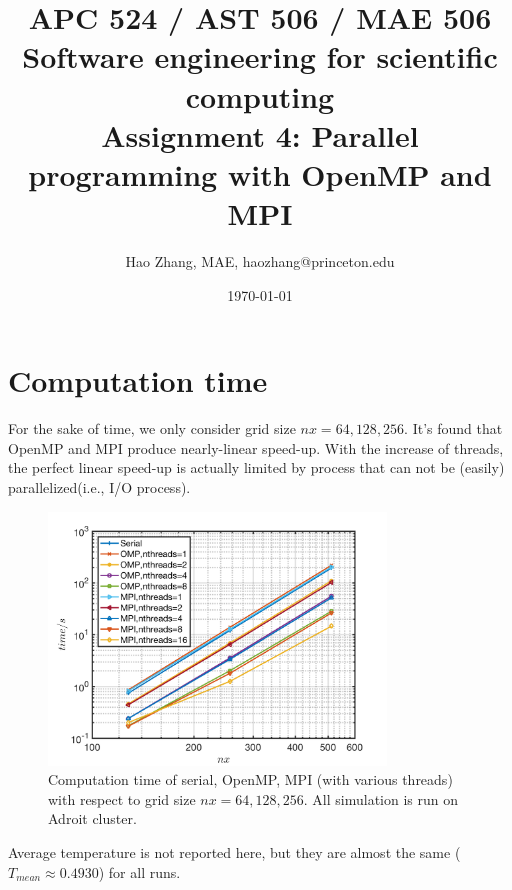 \documentclass[a4paper]{article}
\title{APC 524 / AST 506 / MAE 506 Software engineering for scientific computing
\\Assignment 4: Parallel programming with OpenMP and MPI}
\author{Hao Zhang, MAE, haozhang@princeton.edu}
\date{\today}
\begin{document}
\maketitle

    \section{Computation time}
   For the sake of time, we only consider grid size $nx=64,128,256$. It's found that OpenMP and MPI produce nearly-linear speed-up. With the increase of threads, the perfect linear speed-up is actually limited by process that can not be (easily) parallelized(i.e., I/O process).
      \begin{figure}[H]
            \centering 
            \includegraphics[width=0.8\textwidth]{./Figure/computation_time.png} 
        \caption{Computation time of serial, OpenMP, MPI (with various threads) with respect to grid size $nx=64,128,256$. All simulation is run on Adroit cluster.}
    \end{figure}
    
    Average temperature is not reported here, but they are almost the same ($T_{mean} \approx 0.4930$) for all runs.
    
\end{document}
